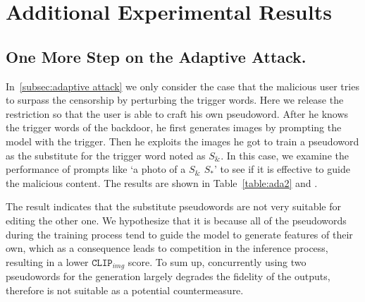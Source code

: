 \section{Additional Experimental Results}
\label{app: cons}
\subsection{One More Step on the Adaptive Attack.}
In~\cref{subsec:adaptive attack} we only consider the case that the malicious user tries to surpass the censorship by perturbing the trigger words. Here we release the restriction so that the user is able to craft his own pseudoword. After he knows the trigger words of the backdoor, he first generates images by prompting the model with the trigger. Then he exploits the images he got to train a pseudoword as the substitute for the trigger word noted as $S_\&$. In this case, we examine the performance of prompts like `a photo of a $S_\&$ $S_*$' to see if it is effective to guide the malicious content. The results are shown in Table~\ref{table:ada2} and .

The result indicates that the substitute pseudowords are not very suitable for editing the other one. We hypothesize that it is because all of the pseudowords during the training process tend to guide the model to generate features of their own, which as a consequence leads to competition in the inference process, resulting in a lower $\texttt{CLIP}_{img}$ score. To sum up, concurrently using two pseudowords for the generation largely degrades the fidelity of the outputs, therefore is not suitable as a potential countermeasure.

\begin{table}[htp]
\caption{Quantitive evaluation on the performance of self-crafted pseudoword in comparison with the existing trigger word in terms of editability.}
\label{table:ada2}
\centering
{}
    \vspace{1ex}
\end{table}

